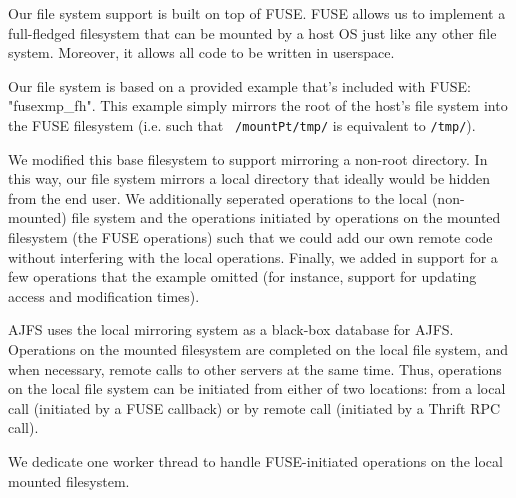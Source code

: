 
Our file system support is built on top of FUSE. FUSE allows us to implement
a full-fledged filesystem that can be mounted by a host OS just like any other
file system. Moreover, it allows all code to be written in userspace.

Our file system is based on a provided example that's included with FUSE:
"fusexmp\_fh". This example simply mirrors the root of the host's file system
into the FUSE filesystem (i.e. such that \texttt{~/mountPt/tmp/} is equivalent to
\texttt{/tmp/}).

We modified this base filesystem to support mirroring a non-root directory. In
this way, our file system mirrors a local directory that ideally would be hidden
from the end user. We additionally seperated operations to the local
(non-mounted) file system and the operations initiated by operations on the
mounted filesystem (the FUSE operations) such that we could add our own remote
code without interfering with the local operations. Finally, we added in support
for a few operations that the example omitted (for instance, support for
updating access and modification times).

AJFS uses the local mirroring system as a black-box database for AJFS.
Operations on the mounted filesystem are completed on the local file system, and
when necessary, remote calls to other servers at the same time. Thus,
operations on the local file system can be initiated from either of two
locations: from a local call (initiated by a FUSE callback) or by remote call
(initiated by a Thrift RPC call).

We dedicate one worker thread to handle FUSE-initiated operations on the local
mounted filesystem.

